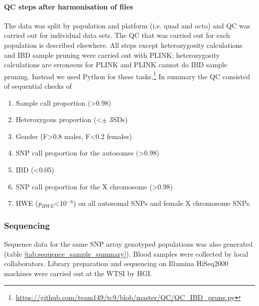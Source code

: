 \paragraph{QC steps after harmonisation of files}
The data was split by population and platform (i.e. quad and octo) and \gls{QC} was carried out for individual data sets. The \gls{QC} that was carried out for each population is described elsewhere.\cite{Gurdasani2015} All steps except heterozygosity calculations and IBD sample pruning were carried out with PLINK; heterozygosity calculations are erroneous for PLINK and PLINK cannot do \gls{IBD} sample pruning. Instead we used Python for these tasks.\footnote{\url{https://github.com/team149/tc9/blob/master/QC/QC_IBD_prune.py}} In summary the QC consisted of sequential checks of
\begin{enumerate}
\item Sample call proportion (>0.98)
\item Heterozygous proportion (\textless $\pm$ 3\glspl{SD})
\item Gender (F>0.8 males, F<0.2 females)
\item SNP call proportion for the autosomes (\textgreater0.98)
\item IBD (<0.05)
\item SNP call proportion for the X chromosome (\textgreater0.98)
\item \gls{HWE} (\textit{p}$_{HWE}$<10$^{-6}$) on all autosomal SNPs and female X chromosome SNPs.
\end{enumerate}

\subsubsection{Sequencing}
\label{subsec:sequence}
Sequence data for the same SNP array genotyped populations was also generated (table \ref{tab:sequence_sample_summary}). Blood samples were collected by local collaborators. Library preparation and sequencing on Illumina HiSeq2000 machines were carried out at the \gls{WTSI} by \gls{HGI}.



